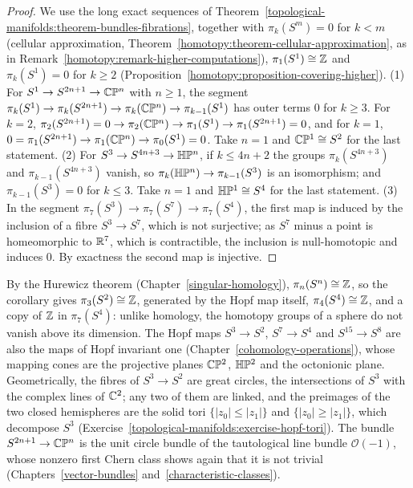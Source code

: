 \begin{proof}
We use the long exact sequences of Theorem~\ref{topological-manifolds:theorem-bundles-fibrations}, together with $\pi_k(S^m) = 0$ for $k < m$ (cellular approximation,
Theorem~\ref{homotopy:theorem-cellular-approximation}, as in Remark~\ref{homotopy:remark-higher-computations}), $\pi_1(S^1) \cong \mathbb{Z}$ and $\pi_k(S^1) = 0$ for $k \geq 2$
(Proposition~\ref{homotopy:proposition-covering-higher}). (1) For $S^1 \to S^{2n+1} \to \mathbb{C}\mathbb{P}^n$ with $n \geq 1$, the segment $\pi_k(S^1) \to \pi_k(S^{2n+1}) \to \pi_k(\mathbb{C}\mathbb{P}^n) \to \pi_{k-1}(S^1)$ has outer terms $0$ for $k \geq 3$.
For $k = 2$, $\pi_2(S^{2n+1}) = 0 \to \pi_2(\mathbb{C}\mathbb{P}^n) \to \pi_1(S^1) \to \pi_1(S^{2n+1}) = 0$, and for $k = 1$, $0 = \pi_1(S^{2n+1}) \to \pi_1(\mathbb{C}\mathbb{P}^n) \to \pi_0(S^1) = 0$. Take $n = 1$ and
$\mathbb{C}\mathbb{P}^1 \cong S^2$ for the last statement. (2) For $S^3 \to S^{4n+3} \to \mathbb{H}\mathbb{P}^n$, if $k \leq 4n + 2$ the groups $\pi_k(S^{4n+3})$ and $\pi_{k-1}(S^{4n+3})$ vanish, so $\pi_k(\mathbb{H}\mathbb{P}^n) \to \pi_{k-1}(S^3)$ is an
isomorphism; and $\pi_{k-1}(S^3) = 0$ for $k \leq 3$. Take $n = 1$ and $\mathbb{H}\mathbb{P}^1 \cong S^4$ for the last statement. (3) In the segment $\pi_7(S^3) \to \pi_7(S^7) \to \pi_7(S^4)$, the first map is induced by the inclusion of
a fibre $S^3 \to S^7$, which is not surjective; as $S^7$ minus a point is homeomorphic to $\mathbb{R}^7$, which is contractible, the inclusion is null-homotopic and induces $0$. By exactness the second map is injective.
\end{proof}

By the Hurewicz theorem (Chapter~\ref{singular-homology}), $\pi_n(S^n) \cong \mathbb{Z}$, so the corollary gives $\pi_3(S^2) \cong \mathbb{Z}$, generated by the Hopf map itself, $\pi_4(S^4) \cong \mathbb{Z}$, and a copy of $\mathbb{Z}$ in
$\pi_7(S^4)$: unlike homology, the homotopy groups of a sphere do not vanish above its dimension. The Hopf maps $S^3 \to S^2$, $S^7 \to S^4$ and $S^{15} \to S^8$ are also the maps of Hopf invariant one
(Chapter~\ref{cohomology-operations}), whose mapping cones are the projective planes $\mathbb{C}\mathbb{P}^2$, $\mathbb{H}\mathbb{P}^2$ and the octonionic plane. Geometrically, the fibres of $S^3 \to S^2$ are great circles, the
intersections of $S^3$ with the complex lines of $\mathbb{C}^2$; any two of them are linked, and the preimages of the two closed hemispheres are the solid tori $\{|z_0| \leq |z_1|\}$ and $\{|z_0| \geq |z_1|\}$, which
decompose $S^3$ (Exercise~\ref{topological-manifolds:exercise-hopf-tori}). The bundle $S^{2n+1} \to \mathbb{C}\mathbb{P}^n$ is the unit circle bundle of the tautological line bundle $\mathcal{O}(-1)$, whose nonzero
first Chern class shows again that it is not trivial (Chapters~\ref{vector-bundles} and~\ref{characteristic-classes}).

